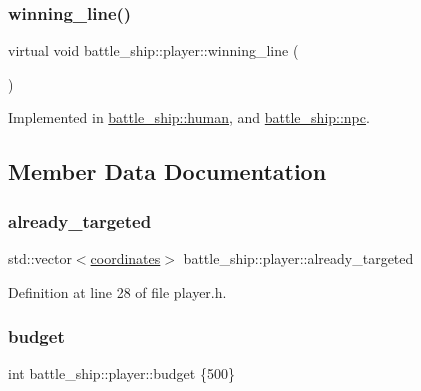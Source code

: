 \subsubsection{\texorpdfstring{winning\+\_\+line()}{winning\_line()}}
{\footnotesize\ttfamily virtual void battle\+\_\+ship\+::player\+::winning\+\_\+line (\begin{DoxyParamCaption}{ }\end{DoxyParamCaption})\hspace{0.3cm}{\ttfamily [pure virtual]}}



Implemented in \hyperlink{classbattle__ship_1_1human_a583d0a9dd05c16f700d0d1825916faa3}{battle\+\_\+ship\+::human}, and \hyperlink{classbattle__ship_1_1npc_a10c65edd38e75ac6be91ecd2dc9c9866}{battle\+\_\+ship\+::npc}.



\subsection{Member Data Documentation}
\mbox{\label{classbattle__ship_1_1player_ac0905b76a660cd06e5fd45f4960d48f9}} 
\subsubsection{\texorpdfstring{already\+\_\+targeted}{already\_targeted}}
{\footnotesize\ttfamily std\+::vector$<$\hyperlink{structbattle__ship_1_1coordinates}{coordinates}$>$ battle\+\_\+ship\+::player\+::already\+\_\+targeted\hspace{0.3cm}{\ttfamily [protected]}}



Definition at line 28 of file player.\+h.

\mbox{\label{classbattle__ship_1_1player_a01f047aac5fcca92ff1e42d4d1e398c9}} 
\subsubsection{\texorpdfstring{budget}{budget}}
{\footnotesize\ttfamily int battle\+\_\+ship\+::player\+::budget \{500\}\hspace{0.3cm}{\ttfamily [protected]}}



